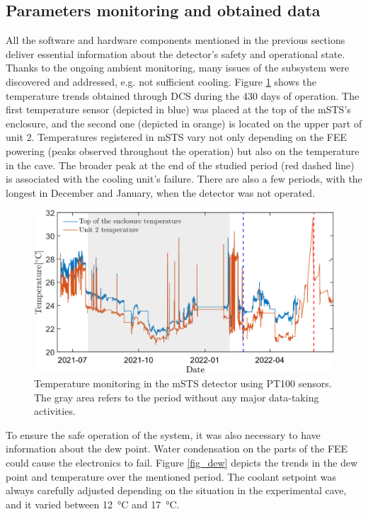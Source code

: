 \subsection{Parameters monitoring and obtained data}
All the software and hardware components mentioned in the previous sections deliver essential information about the detector's safety and operational state. Thanks to the ongoing ambient monitoring, many issues of the subsystem were discovered and addressed, e.g. not sufficient cooling. Figure \ref{fig_temp} shows the temperature trends obtained through \gls{DCS} during the 430 days of operation. The first temperature sensor (depicted in blue) was placed at the top of the \gls{mSTS}'s enclosure, and the second one (depicted in orange) is located on the upper part of unit 2. Temperatures registered in \gls{mSTS} vary not only depending on the \gls{FEE} powering (peaks observed throughout the operation) but also on the temperature in the cave. The broader peak at the end of the studied period (red dashed line) is associated with the cooling unit's failure. There are also a few periods, with the longest in December and January, when the detector was not operated. 

\begin{figure}[!h]
\centering
\includegraphics[width=0.9\columnwidth]{Chapter6/DCS/images/temp2.png}
\caption{Temperature monitoring in the \gls{mSTS} detector using PT100 sensors. The gray area refers to the period without any major data-taking activities.}
\label{fig_temp}
\end{figure}
\newpage
To ensure the safe operation of the system, it was also necessary to have information about the dew point. Water condensation on the parts of the \gls{FEE} could cause the electronics to fail. Figure \ref{fig_dew} depicts the trends in the dew point and temperature over the mentioned period. The coolant setpoint was always carefully adjusted depending on the situation in the experimental cave, and it varied between \SI{12}{\celsius} and \SI{17}{\celsius}.

